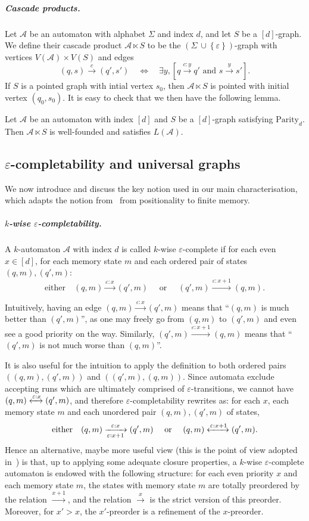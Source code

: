 \documentclass[a4paper,UKenglish,cleveref, thm-restate]{lipics-v2021}
\newcommand{\re}[1]{\xrightarrow{#1}}
\newcommand{\rer}[1]{\xleftrightarrow{#1}}
\newcommand{\tor}{\text{ or }}
\newcommand{\Parity}{\mathrm{Parity}}
\newcommand{\eps}{\varepsilon}
\newcommand{\A}{\mathcal{A}}
\newcommand{\casc}{\ltimes}
\newcommand{\Sigmaeps}{\Sigma\ {\cup} \left\{\eps\right\}}
\renewcommand{\d}{[d]}
\begin{document}
\subparagraph{Cascade products.} Let $\A$ be an automaton with alphabet $\Sigma$ and index $d$, and let $S$ be a $\d$-graph.
We define their cascade product $\A \casc S$ to be the $(\Sigmaeps)$-graph with vertices $V(\A) \times V(S)$ and edges
\[
    (q,s) \re c (q',s') \quad \iff \quad \exists y, [q \re {c:y} q' \text{ and } s \re y s'].
\]
If $S$ is a pointed graph with intial vertex $s_0$, then $\A \casc S$ is pointed with initial vertex $(q_0,s_0)$.
It is easy to check that we then have the following lemma.

\begin{lemma}\label{lem:cascade_products}
    Let $\A$ be an automaton with index $\d$ and $S$ be a $\d$-graph satisfying $\Parity_d$.
    Then $\A \casc S$ is well-founded and satisfies $L(\A)$.
\end{lemma}

\subsection{$\eps$-completability and universal graphs}
We now introduce and discuss the key notion used in our main characterisation, which adapts the notion from~\cite{CO24Positional} from positionality to finite memory.

\subparagraph*{$k$-wise $\eps$-completability.}
A $k$-automaton $\A$ with index $d$ is called $k$-wise $\eps$-complete if for each even $x \in \d$, for each memory state $m$ and each ordered pair of states $(q,m),(q',m)$:
\[
    \text{either} \quad (q,m) \re{\eps:x} (q',m) \quad \tor \quad (q',m) \re{\eps:x+1} (q,m). \]

Intuitively, having an edge $(q,m) \re{\eps:x} (q',m)$ means that ``$(q,m)$ is much better than $(q',m)$'', as one may freely go from $(q,m)$ to $(q',m)$ and even see a good priority on the way.
Similarly, $(q',m) \re{\eps:x+1} (q,m)$ means that ``$(q',m)$ is not much worse than $(q,m)$''.


It is also useful for the intuition to apply the definition to both ordered pairs $((q,m),(q',m))$ and $((q',m),(q,m))$.
Since automata exclude accepting runs which are ultimately comprised of $\eps$-transitions, we cannot have $(q,m) \rer{\eps:x} (q',m)$, and therefore $\eps$-completability rewrites as: for each $x$, each memory state $m$ and each unordered pair $(q,m),(q',m)$ of states,
\[
    \text{either} \quad (q,m) \xrightarrow[\eps :x+1]{\eps:x} (q',m) \quad \tor \quad (q,m) \rer{\eps:x+1} (q',m). 
\]
Hence an alternative, maybe more useful view (this is the point of view adopted in~\cite{CO24Positional}) is that, up to applying some adequate closure properties, a $k$-wise $\eps$-complete automaton is endowed with the following structure: for each even priority $x$ and each memory state $m$, the states with memory state $m$ are totally preordered by the relation $\re {x+1}$, and the relation $\re x$ is the strict version of this preorder.
Moreover, for $x'>x$, the $x'$-preorder is a refinement of the $x$-preorder.
\end{document}

